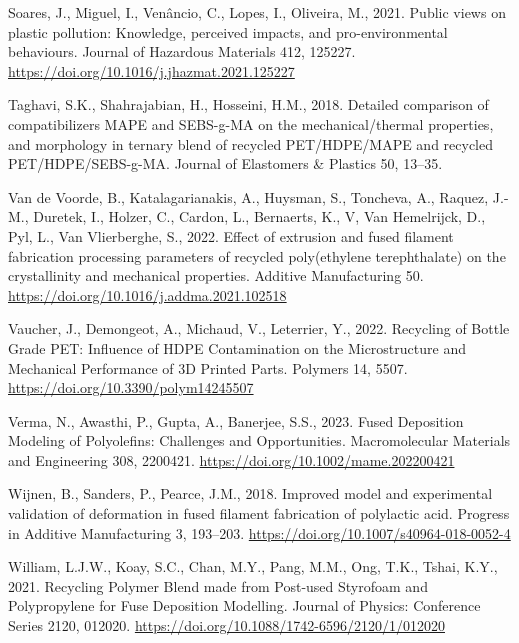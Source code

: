 \documentclass[
  12pt,
  number,
  review]{elsarticle}
\newlength{\cslhangindent}
\newlength{\cslentryspacingunit} %
\newenvironment{CSLReferences}[2] %
 {%
  \setlength{\parindent}{0pt}
  \ifodd #1
  \let\oldpar\par
  \def\par{\hangindent=\cslhangindent\oldpar}
  \fi
  \setlength{\parskip}{#2\cslentryspacingunit}
 }%
 {}
\begin{document}
\begin{CSLReferences}{1}{0}
\leavevmode{}%
Soares, J., Miguel, I., Venâncio, C., Lopes, I., Oliveira, M., 2021.
Public views on plastic pollution: {Knowledge}, perceived impacts, and
pro-environmental behaviours. Journal of Hazardous Materials 412,
125227. \url{https://doi.org/10.1016/j.jhazmat.2021.125227}

\leavevmode{}%
Taghavi, S.K., Shahrajabian, H., Hosseini, H.M., 2018. Detailed
comparison of compatibilizers MAPE and SEBS-g-MA on the
mechanical/thermal properties, and morphology in ternary blend of
recycled PET/HDPE/MAPE and recycled PET/HDPE/SEBS-g-MA. Journal of
Elastomers \& Plastics 50, 13--35.

\leavevmode{}%
Van de Voorde, B., Katalagarianakis, A., Huysman, S., Toncheva, A.,
Raquez, J.-M., Duretek, I., Holzer, C., Cardon, L., Bernaerts, K., V,
Van Hemelrijck, D., Pyl, L., Van Vlierberghe, S., 2022. Effect of
extrusion and fused filament fabrication processing parameters of
recycled poly(ethylene terephthalate) on the crystallinity and
mechanical properties. Additive Manufacturing 50.
\url{https://doi.org/10.1016/j.addma.2021.102518}

\leavevmode{}%
Vaucher, J., Demongeot, A., Michaud, V., Leterrier, Y., 2022. Recycling
of {Bottle Grade PET}: {Influence} of {HDPE Contamination} on the
{Microstructure} and {Mechanical Performance} of {3D Printed Parts}.
Polymers 14, 5507. \url{https://doi.org/10.3390/polym14245507}

\leavevmode{}%
Verma, N., Awasthi, P., Gupta, A., Banerjee, S.S., 2023. Fused
{Deposition Modeling} of {Polyolefins}: {Challenges} and
{Opportunities}. Macromolecular Materials and Engineering 308, 2200421.
\url{https://doi.org/10.1002/mame.202200421}

\leavevmode{}%
Wijnen, B., Sanders, P., Pearce, J.M., 2018. Improved model and
experimental validation of deformation in fused filament fabrication of
polylactic acid. Progress in Additive Manufacturing 3, 193--203.
\url{https://doi.org/10.1007/s40964-018-0052-4}

\leavevmode{}%
William, L.J.W., Koay, S.C., Chan, M.Y., Pang, M.M., Ong, T.K., Tshai,
K.Y., 2021. Recycling {Polymer Blend} made from {Post-used Styrofoam}
and {Polypropylene} for {Fuse Deposition Modelling}. Journal of Physics:
Conference Series 2120, 012020.
\url{https://doi.org/10.1088/1742-6596/2120/1/012020}


\end{CSLReferences}
\end{document}
